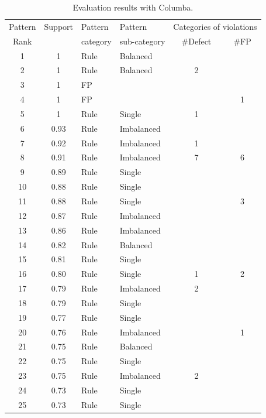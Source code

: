 {\setlength{\tabcolsep}{1pt}
\begin{table}[t]
\begin{SmallOut}
\begin{CodeOut}
\begin{center}
\centering \caption {\label{tab:columba} Evaluation results with Columba.}
\begin {tabular} {|c|c|l|l|c|c|}
\hline
Pattern&Support&Pattern&Pattern&\multicolumn{2}{|c|}{Categories of violations}\\
\cline{5-6}
Rank&&category&sub-category&\#Defect&\#FP\\
\hline
\hline 1&1&Rule& Balanced & &\\
\hline 2&1&Rule& Balanced & 2 &\\
\hline 3&1&FP& & &\\
\hline 4&1&FP& & & 1 \\
\hline 5&1&Rule& Single & 1 & \\
\hline 6&0.93&Rule& Imbalanced & &\\
\hline 7&0.92&Rule& Imbalanced & 1 &\\
\hline 8&0.91&Rule& Imbalanced & 7 & 6\\
\hline 9&0.89&Rule& Single & &\\
\hline 10&0.88&Rule& Single & &\\
\hline 11&0.88&Rule& Single & & 3\\
\hline 12&0.87&Rule& Imbalanced & &\\
\hline 13&0.86&Rule& Imbalanced & &\\
\hline 14&0.82&Rule& Balanced & &\\
\hline 15&0.81&Rule& Single & &\\
\hline 16&0.80&Rule& Single & 1 & 2\\
\hline 17&0.79&Rule& Imbalanced & 2 &\\
\hline 18&0.79&Rule& Single & &\\
\hline 19&0.77&Rule& Single & &\\
\hline 20&0.76&Rule& Imbalanced & & 1\\
\hline 21&0.75&Rule& Balanced & &\\
\hline 22&0.75&Rule& Single & &\\
\hline 23&0.75&Rule& Imbalanced & 2 &\\
\hline 24&0.73&Rule& Single & &\\
\hline 25&0.73&Rule& Single & &\\
\hline
\end{tabular}
\end{center}
\end{CodeOut}
\end{SmallOut}
\end{table}

}
